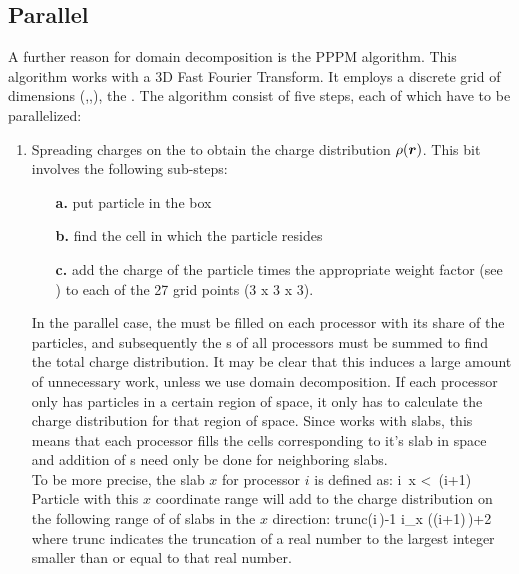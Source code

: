 \subsection{Parallel }
A further reason for domain decomposition is the PPPM algorithm. This
algorithm works with a 3D Fast Fourier Transform. It employs a
discrete grid of dimensions (\nx,\ny,\nz), the {\fftgrid}. The
algorithm consist of five steps, each of which have to be
parallelized:
\begin{enumerate}
\item   Spreading charges on the {\fftgrid} to obtain the charge 
        distribution $\rho(\mbox{\boldmath ${r}$})$.
        This bit involves the following sub-steps:
        \begin{enumerate}
        \item[{\bf a.}] put particle in the box
        \item[{\bf b.}] find the {\fftgrid} cell in which the particle resides
        \item[{\bf c.}] add the charge of the particle times the appropriate
                        weight factor (see ) to 
                        each of the 27 grid points (3 x 3 x 3).
        \end{enumerate}
        In the parallel case, the {\fftgrid} 
        must be filled on each processor with its
        share of the particles, and subsequently the {\fftgrid}s of all processors
        must be summed to find the total charge distribution. It may be clear that
        this induces a large amount of unnecessary work, unless we use domain
        decomposition. If each processor only has particles in a certain region
        of space, it only has to calculate the charge distribution for 
        that region of space. Since {\gromacs} works with slabs, this means that
        each processor fills the {\fftgrid} cells corresponding to it's slab in space
        and addition of {\fftgrid}s need only be done for neighboring slabs.\\
        To be more precise, the slab $x$ for processor $i$ is defined as:
        \beq
        i\,  \le x <\, (i+1)
        \eeq
        Particle with this $x$ coordinate range will add to the charge distribution
        on the following range of 
        of {\fftgrid} slabs in the $x$ direction:
        \beq
        {\rm trunc}\left(i\,\right)-1 \le i_x \left((i+1)\,\right)+2
        \eeq
        where trunc indicates the truncation of a real number to the largest integer
        smaller than or equal to that real number.
        

\end{enumerate}
